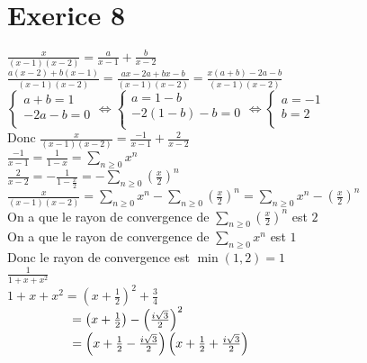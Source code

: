 \documentclass{article}
\author{Frederic Becerril}
\newcommand\tab[1][1cm]{\hspace*{#1}}
\begin{document}
\part*{Exerice 8}

$\frac{x}{(x-1)(x-2)} = \frac{a}{x - 1} + \frac{b}{x -  2}$ \vspace{3mm}\\
$\frac{a(x- 2)+b(x - 1)}{(x-1)(x-2)} = \frac{ax -2a +bx -b}{(x-1)(x-2)} = \frac{x(a + b) -2a -b}{(x-1)(x-2)}$ \vspace{3mm}\\
$\left\{
    \begin{array}{ll}
        a + b = 1\\
        -2a - b = 0\\
    \end{array}
\right. \Leftrightarrow \left\{
    \begin{array}{ll}
        a = 1 - b\\
        -2(1 - b) - b = 0\\
    \end{array}
\right. \Leftrightarrow \left\{
    \begin{array}{ll}
        a = -1\\
        b = 2\\
    \end{array}
\right.$\\
Donc $\frac{x}{(x-1)(x-2)} = \frac{-1}{x - 1} + \frac{2}{x -  2}$\\
$ \frac{-1}{x - 1} = \frac{1}{1 - x} = \sum_{n \geq 0} x^n$\\
$ \frac{2}{x -  2} = -\frac{1}{1 - \frac{x}{2}} = -\sum_{n \geq 0} \left(\frac{x}{2}\right)^n$\\
$\frac{x}{(x-1)(x-2)} = \sum_{n \geq 0} x^n - \sum_{n \geq 0} \left(\frac{x}{2}\right)^n = \sum_{n \geq 0} x^n - \left(\frac{x}{2}\right)^n$\\
On a que le rayon de convergence de $\sum_{n \geq 0} \left(\frac{x}{2}\right)^n$ est $2$\\
On a que le rayon de convergence de $\sum_{n \geq 0} x^n$ est $1$\\
Donc le rayon de convergence est $\min(1, 2) = 1$\\
$\frac{1}{1 + x + x^2}$\\
$1 + x + x^2 = \left(x + \frac{1}{2}\right)^2 + \frac{3}{4}$\\
$\tab[1.8cm] = \left(x + \frac{1}{2}\right) - \left(\frac{i\sqrt{3}}{2}\right)^2$\\
$\tab[1.8cm] = \left(x + \frac{1}{2} - \frac{i\sqrt{3}}{2}\right) \left(x + \frac{1}{2} + \frac{i\sqrt{3}}{2}\right)$\\
\end{document}
